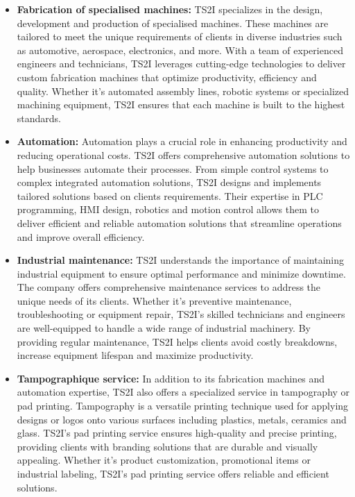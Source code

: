 \begin{itemize}

    \item \textbf{Fabrication of specialised machines:} TS2I specializes in the design, development
    and production of specialised machines. These machines are tailored to meet the
    unique requirements of clients in diverse industries such as automotive, aerospace, electronics,
    and more. With a team of experienced engineers and technicians, TS2I leverages cutting-edge
    technologies to deliver custom fabrication machines that optimize productivity, efficiency and
    quality. Whether it's automated assembly lines, robotic systems or specialized machining
    equipment, TS2I ensures that each machine is built to the highest standards.

    \item \textbf{Automation:} Automation plays a crucial role in enhancing productivity and reducing
    operational costs. TS2I offers comprehensive automation solutions to help businesses automate
    their processes. From simple control systems to complex integrated automation solutions, TS2I
    designs and implements tailored solutions based on clients requirements. Their
    expertise in PLC programming, HMI design, robotics and motion control allows them to deliver
    efficient and reliable automation solutions that streamline operations and improve overall
    efficiency.

    \item \textbf{Industrial maintenance:} TS2I understands the importance of maintaining industrial
    equipment to ensure optimal performance and minimize downtime. The company offers comprehensive
    maintenance services to address the unique needs of its clients. Whether it's preventive
    maintenance, troubleshooting or equipment repair, TS2I's skilled technicians and engineers are
    well-equipped to handle a wide range of industrial machinery. By providing regular maintenance,
    TS2I helps clients avoid costly breakdowns, increase equipment lifespan and maximize
    productivity.

    \item \textbf{Tampographique service:} In addition to its fabrication machines and automation
    expertise, TS2I also offers a specialized service in tampography or pad printing. Tampography
    is a versatile printing technique used for applying designs or logos onto various surfaces
    including plastics, metals, ceramics and glass. TS2I's pad printing service ensures
    high-quality and precise printing, providing clients with branding solutions that are durable
    and visually appealing. Whether it's product customization, promotional items or industrial
    labeling, TS2I's pad printing service offers reliable and efficient solutions.

\end{itemize}


